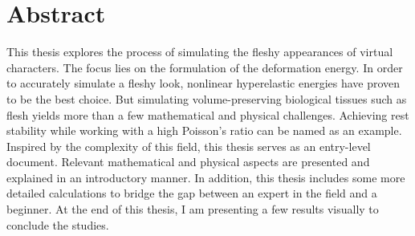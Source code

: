 \chapter*{Abstract}
This thesis explores the process of simulating the fleshy appearances of virtual characters. The focus lies on the formulation of the deformation energy. In order to accurately simulate a fleshy look, nonlinear hyperelastic energies have proven to be the best choice. But simulating volume-preserving biological tissues such as flesh yields more than a few mathematical and physical challenges. Achieving rest stability while working with a high Poisson's ratio can be named as an example. Inspired by the complexity of this field, this thesis serves as an entry-level document. Relevant mathematical and physical aspects are presented and explained in an introductory manner. In addition, this thesis includes some more detailed calculations to bridge the gap between an expert in the field and a beginner. At the end of this thesis, I am presenting a few results visually to conclude the studies. 
